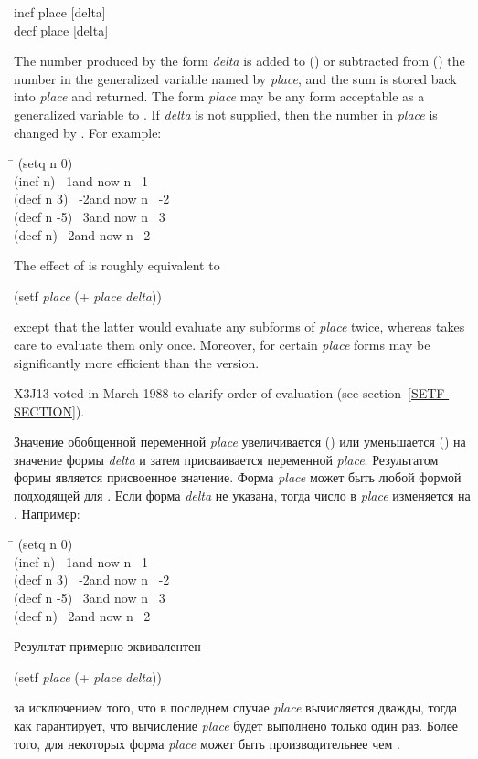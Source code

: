 \begin{defmac}
incf place [delta] \\
decf place [delta]

The number produced by the form \emph{delta}
is added to () or subtracted from ()
the number in the generalized variable named by \emph{place},
and the sum is stored back into \emph{place} and returned.
The form \emph{place} may be any form acceptable
as a generalized variable to .
If \emph{delta} is not supplied, then the number in \emph{place} is changed
by .
For example:
\begin{lisp}
\hskip 9pc\=\kill
(setq n 0) \\
(incf n) \EV\ 1\>\textrm{and now} n \EV\ 1 \\
(decf n 3) \EV\ -2\>\textrm{and now} n \EV\ -2 \\
(decf n -5) \EV\ 3\>\textrm{and now} n \EV\ 3 \\
(decf n) \EV\ 2\>\textrm{and now} n \EV\ 2
\end{lisp}
The effect of 
is roughly equivalent to
\begin{lisp}
(setf \emph{place} (+ \emph{place} \emph{delta}))
\end{lisp}
except that the latter would evaluate any subforms of \emph{place}
twice, whereas  takes care to evaluate them only once.
Moreover, for certain \emph{place} forms  may be
significantly more efficient than the  version.
\begin{newer}
X3J13 voted in March 1988 
to clarify order of evaluation (see section~\ref{SETF-SECTION}).
\end{newer}

Значение обобщенной переменной \emph{place} увеличивается () или
уменьшается () на значение формы
\emph{delta} и затем присваивается переменной \emph{place}.
Результатом формы является присвоенное значение.
Форма \emph{place} может быть любой формой подходящей для .
Если форма \emph{delta} не указана, тогда число в \emph{place} изменяется на
.
Например:
\begin{lisp}
\hskip 9pc\=\kill
(setq n 0) \\
(incf n) \EV\ 1\>\textrm{and now} n \EV\ 1 \\
(decf n 3) \EV\ -2\>\textrm{and now} n \EV\ -2 \\
(decf n -5) \EV\ 3\>\textrm{and now} n \EV\ 3 \\
(decf n) \EV\ 2\>\textrm{and now} n \EV\ 2
\end{lisp}
Результат  примерно эквивалентен
\begin{lisp}
(setf \emph{place} (+ \emph{place} \emph{delta}))
\end{lisp}
за исключением того, что в последнем случае \emph{place} вычисляется дважды,
тогда как  гарантирует, что вычисление \emph{place} будет выполнено
только один раз.
Более того, для некоторых форма \emph{place}  может быть
производительнее чем .
\end{defmac}

